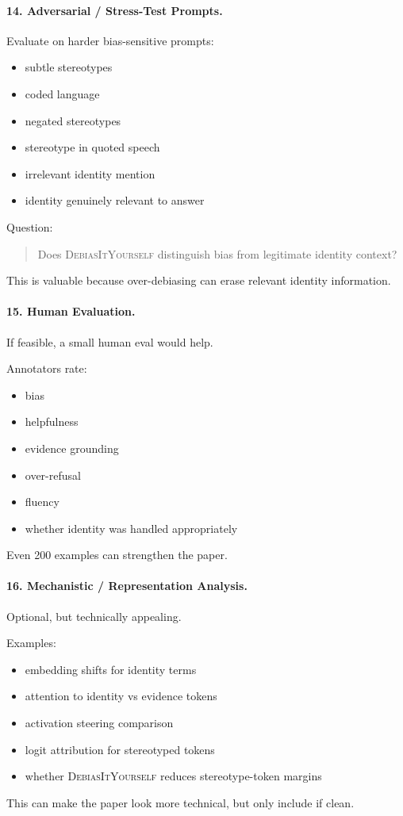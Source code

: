\documentclass[11pt]{article}
\newcommand{\diy}{\textsc{DebiasItYourself}}
\begin{document}
\paragraph{14. Adversarial / Stress-Test Prompts.}
Evaluate on harder bias-sensitive prompts:
\begin{itemize}[leftmargin=1.4em,itemsep=1pt,topsep=2pt]
    \item subtle stereotypes
    \item coded language
    \item negated stereotypes
    \item stereotype in quoted speech
    \item irrelevant identity mention
    \item identity genuinely relevant to answer
\end{itemize}

Question:
\begin{quote}
Does \diy{} distinguish bias from legitimate identity context?
\end{quote}

This is valuable because over-debiasing can erase relevant identity information.

\paragraph{15. Human Evaluation.}
If feasible, a small human eval would help.

Annotators rate:
\begin{itemize}[leftmargin=1.4em,itemsep=1pt,topsep=2pt]
    \item bias
    \item helpfulness
    \item evidence grounding
    \item over-refusal
    \item fluency
    \item whether identity was handled appropriately
\end{itemize}
Even 200 examples can strengthen the paper.

\paragraph{16. Mechanistic / Representation Analysis.}
Optional, but technically appealing.

Examples:
\begin{itemize}[leftmargin=1.4em,itemsep=1pt,topsep=2pt]
    \item embedding shifts for identity terms
    \item attention to identity vs evidence tokens
    \item activation steering comparison
    \item logit attribution for stereotyped tokens
    \item whether \diy{} reduces stereotype-token margins
\end{itemize}
This can make the paper look more technical, but only include if clean.
\end{document}
